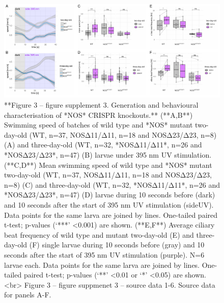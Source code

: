 \documentclass[
  10pt,
  onecolumn]{article}
\begin{document}
\begin{figure}
\includegraphics[width=41.67in]{figures/Fig3_sup3} \caption{**Figure 3 -- figure supplement 3. Generation and behavioural characterisation of *NOS* CRISPR knockouts.** (**A,B**) Swimming speed of batches of wild type and *NOS* mutant two-day-old (WT, n=37, NOSΔ11/Δ11, n=18 and NOSΔ23/Δ23, n=8) (A) and three-day-old (WT, n=32, *NOSΔ11/Δ11*, n=26 and *NOSΔ23/Δ23*, n=47) (B) larvae under 395 nm UV stimulation. (**C,D**) Mean swimming speed of wild type and *NOS* mutant two-day-old (WT, n=37, NOSΔ11/Δ11, n=18 and NOSΔ23/Δ23, n=8) (C) and three-day-old (WT, n=32, *NOSΔ11/Δ11*, n=26 and *NOSΔ23/Δ23*, n=47) (D) larvae during 10 seconds before (dark) and 10 seconds after the start of 395 nm UV stimulation (sideUV). Data points for the same larva are joined by lines. One-tailed paired t-test; p-values (‘***’ <0.001) are shown. (**E,F**) Average ciliary beat frequency of wild type and mutant two-day-old (E) and three-day-old (F) single larvae during 10 seconds before (gray) and 10 seconds after the start of 395 nm UV stimulation (purple). N=6 larvae each. Data points for the same larva are joined by lines. One-tailed paired t-test; p-values (‘**’ <0.01 or ‘*’ <0.05) are shown. <br> Figure 3 -- figure suppmenet 3 -- source data 1-6. Source data for panels A-F.}\label{fig:unnamed-chunk-15}
\end{figure}
\end{document}
